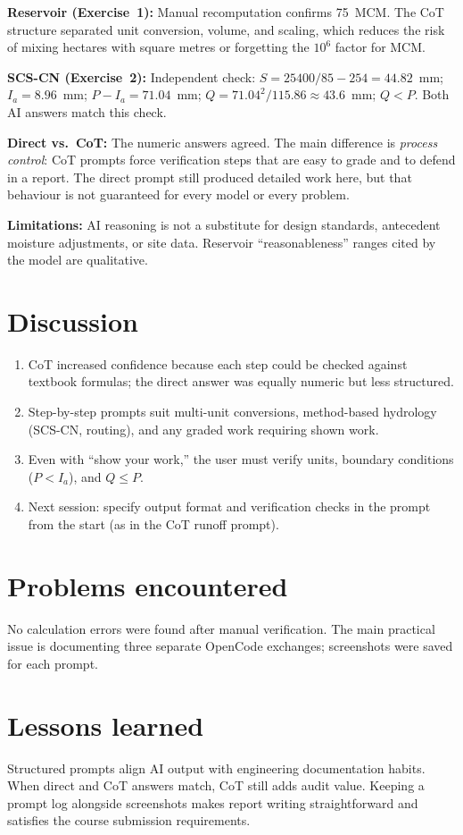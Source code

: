 \documentclass[11pt,a4paper]{article}
\begin{document}
\textbf{Reservoir (Exercise~1):} Manual recomputation confirms 75~MCM. The CoT structure separated unit conversion, volume, and scaling, which reduces the risk of mixing hectares with square metres or forgetting the $10^6$ factor for MCM.

\textbf{SCS-CN (Exercise~2):} Independent check: $S = 25400/85 - 254 = 44.82$~mm; $I_a = 8.96$~mm; $P - I_a = 71.04$~mm; $Q = 71.04^2 / 115.86 \approx 43.6$~mm; $Q < P$. Both AI answers match this check.

\textbf{Direct vs.\ CoT:} The numeric answers agreed. The main difference is \emph{process control}: CoT prompts force verification steps that are easy to grade and to defend in a report. The direct prompt still produced detailed work here, but that behaviour is not guaranteed for every model or every problem.

\textbf{Limitations:} AI reasoning is not a substitute for design standards, antecedent moisture adjustments, or site data. Reservoir ``reasonableness'' ranges cited by the model are qualitative.

\section{Discussion}
\begin{enumerate}[noitemsep]
  \item CoT increased confidence because each step could be checked against textbook formulas; the direct answer was equally numeric but less structured.
  \item Step-by-step prompts suit multi-unit conversions, method-based hydrology (SCS-CN, routing), and any graded work requiring shown work.
  \item Even with ``show your work,'' the user must verify units, boundary conditions ($P < I_a$), and $Q \le P$.
  \item Next session: specify output format and verification checks in the prompt from the start (as in the CoT runoff prompt).
\end{enumerate}

\section{Problems encountered}
No calculation errors were found after manual verification. The main practical issue is documenting three separate OpenCode exchanges; screenshots were saved for each prompt.

\section{Lessons learned}
Structured prompts align AI output with engineering documentation habits. When direct and CoT answers match, CoT still adds audit value. Keeping a prompt log alongside screenshots makes report writing straightforward and satisfies the course submission requirements.
\end{document}
